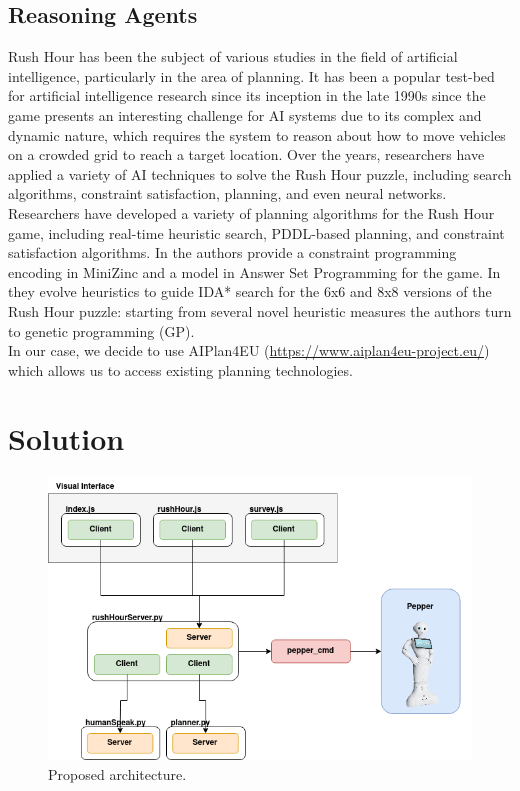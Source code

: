\documentclass{article}
\begin{document}
\subsection{Reasoning Agents}
Rush Hour has been the subject of various studies in the field of artificial intelligence, particularly in the area of planning. It has been a popular test-bed for artificial intelligence research since its inception in the late 1990s since the game presents an interesting challenge for AI systems due to its complex and dynamic nature, which requires the system to reason about how to move vehicles on a crowded grid to reach a target location. Over the years, researchers have applied a variety of AI techniques to solve the Rush Hour puzzle, including search algorithms, constraint satisfaction, planning, and even neural networks. Researchers have developed a variety of planning algorithms for the Rush Hour game, including real-time heuristic search, PDDL-based planning, and constraint satisfaction algorithms. In \cite{minizinc} the authors provide a constraint programming encoding in MiniZinc and a model in Answer Set Programming for the game. In \cite{genetic} they evolve heuristics to guide IDA* search for the 6x6 and 8x8 versions of the Rush Hour puzzle: starting from several novel heuristic measures the authors turn to genetic programming (GP).\\
\indent In our case, we decide to use AIPlan4EU (\url{https://www.aiplan4eu-project.eu/}) which allows us to access existing planning technologies.  


\section{Solution}

\begin{figure}[H]
    \centering
    \includegraphics[width=\textwidth]{images/architecture.drawio.png}
    \caption{Proposed architecture.}
    \label{fig:architecture}
\end{figure}
\end{document}
